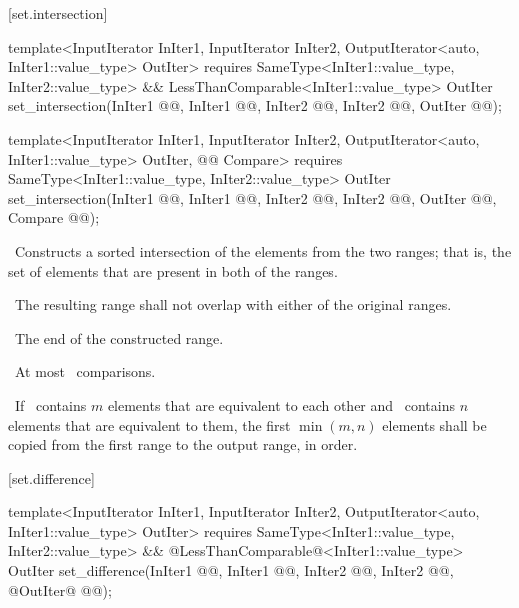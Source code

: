 \documentclass[american,twoside]{book}
\begin{document}
\begin{paras}
[set.intersection]{}

%
\color{addclr}\begin{itemdecl}
template<InputIterator InIter1, InputIterator InIter2,
         OutputIterator<auto, InIter1::value_type> OutIter>
  requires SameType<InIter1::value_type, InIter2::value_type> &&
        LessThanComparable<InIter1::value_type>
  OutIter set_intersection(InIter1 @@, InIter1 @@,
                           InIter2 @@, InIter2 @@,
                           OutIter @@);

template<InputIterator InIter1, InputIterator InIter2,
         OutputIterator<auto, InIter1::value_type> OutIter, 
         @@ Compare>
  requires SameType<InIter1::value_type, InIter2::value_type>
  OutIter set_intersection(InIter1 @@, InIter1 @@,
                           InIter2 @@, InIter2 @@,
                           OutIter @@, Compare @@);
\end{itemdecl}\color{black}

\begin{itemdescr}
\pnum
\effects\ 
Constructs a sorted intersection of the elements from the two ranges;
that is, the set of elements that are present in both of the ranges.

\pnum
\requires\ 
The resulting range shall not overlap with either of the original ranges.

\pnum
\returns\ 
The end of the constructed range.

\pnum
\complexity\ 
At most
\
comparisons.

\pnum
\notes\ If \ contains $m$ elements that are equivalent to
each other and \range{first2}{last2}\ contains $n$ elements that are equivalent
to them, the first $\min(m, n)$ elements shall be copied from the first range
to the output range, in order.
\end{itemdescr}

\rSec3[set.difference]{\tcode{set_difference}}

%
\color{addclr}\begin{itemdecl}
template<InputIterator InIter1, InputIterator InIter2,
         OutputIterator<auto, InIter1::value_type> OutIter>
  requires SameType<InIter1::value_type, InIter2::value_type> &&
           @\textcolor{addclr}{LessThanComparable}@<InIter1::value_type>
  OutIter set_difference(InIter1 @@, InIter1 @@,
                         InIter2 @\farg{first2}@, InIter2 @@,
                         @\textcolor{addclr}{OutIter}@ @@);


\end{itemdecl}
\end{paras}
\end{document}
